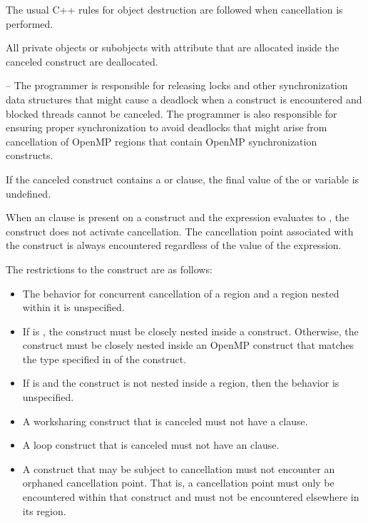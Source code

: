 \cppspecificstart
The usual C++ rules for object destruction are followed when cancellation is performed.
\cppspecificend

\fortranspecificstart
All private objects or subobjects with  attribute that are allocated inside 
the canceled construct are deallocated.
\fortranspecificend

\notestart
\noteheader – The programmer is responsible for releasing locks and other synchronization data structures that might cause a deadlock when a  construct is encountered and blocked threads cannot be canceled. The programmer is also responsible for ensuring proper synchronization to avoid deadlocks that might arise from cancellation of OpenMP regions that contain OpenMP synchronization constructs.
\noteend

If the canceled construct contains a  or  clause, the final 
value of the  or  variable is undefined.

When an  clause is present on a  construct and the  expression evaluates 
to , the  construct does not activate cancellation. The cancellation point 
associated with the  construct is always encountered regardless of the value of 
the  expression.

\restrictions
The restrictions to the  construct are as follows:

\begin{itemize}
\item The behavior for concurrent cancellation of a region and a region nested within it is 
unspecified.

\item If  is , the  construct must be closely 
nested inside a  construct. Otherwise, the  construct must be closely 
nested inside an OpenMP construct that matches the type specified in 
 of the  construct.

\item If  is  and the  construct is not nested 
inside a  region, then the behavior is unspecified.

\item A worksharing construct that is canceled must not have a  clause.

\item A loop construct that is canceled must not have an  clause.

\item A construct that may be subject to cancellation must not encounter an orphaned 
cancellation point. That is, a cancellation point must only be encountered within that 
construct and must not be encountered elsewhere in its region.
\end{itemize}

